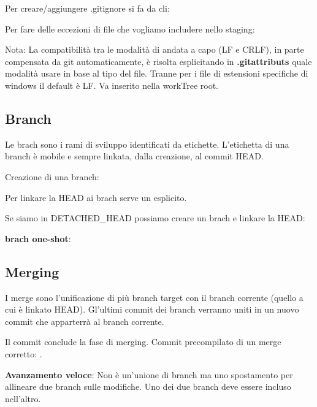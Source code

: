 Per creare/aggiungere .gitignore si fa da cli:


Per fare delle eccezioni di file che vogliamo includere nello staging:



Nota: La compatibilità tra le modalità di andata a capo (LF e CRLF), in parte compensata da git automaticamente, è risolta esplicitando in \textbf{.gitattributs} quale modalità usare in base al tipo del file. Tranne per i file di estensioni specifiche di windows il default è LF. Va inserito nella workTree root.

\subsection{Branch}
Le brach sono i rami di sviluppo identificati da etichette.
L'etichetta di una branch è mobile e sempre linkata, dalla creazione, al commit HEAD.

Creazione di una branch:


Per linkare la HEAD ai brach serve un  esplicito.

\bigskip

Se siamo in DETACHED\_HEAD possiamo creare un brach e linkare la HEAD:

\textbf{brach one-shot}: 

\subsection{Merging}
I merge sono l'unificazione di più branch target con il branch corrente (quello a cui è linkato HEAD). Gl'ultimi commit dei branch verranno uniti in un nuovo commit che apparterrà al branch corrente.


Il commit conclude la fase di merging. Commit precompilato di un merge corretto: .

\textbf{Avanzamento veloce}: Non è un'unione di branch ma uno spostamento per allineare due branch sulle modifiche. Uno dei due branch deve essere incluso nell'altro.